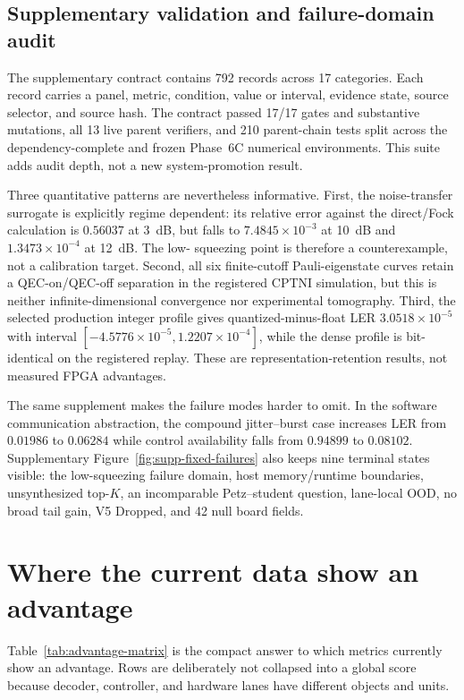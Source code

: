 \documentclass[11pt]{article}
\begin{document}
\subsection{Supplementary validation and failure-domain audit}

The supplementary contract contains 792 records across 17 categories.  Each
record carries a panel, metric, condition, value or interval, evidence state,
source selector, and source hash.  The contract passed 17/17 gates and
substantive mutations, all 13 live parent verifiers, and 210 parent-chain tests
split across the dependency-complete and frozen Phase~6C numerical
environments.  This suite adds audit depth, not a new system-promotion result.

Three quantitative patterns are nevertheless informative.  First, the
noise-transfer surrogate is explicitly regime dependent: its relative error
against the direct/Fock calculation is $0.56037$ at 3~dB, but falls to
$7.4845\times10^{-3}$ at 10~dB and $1.3473\times10^{-4}$ at 12~dB.  The low-
squeezing point is therefore a counterexample, not a calibration target.
Second, all six finite-cutoff Pauli-eigenstate curves retain a QEC-on/QEC-off
separation in the registered CPTNI simulation, but this is neither
infinite-dimensional convergence nor experimental tomography.  Third, the
selected production integer profile gives quantized-minus-float LER
$3.0518\times10^{-5}$ with interval
$[-4.5776\times10^{-5},1.2207\times10^{-4}]$, while the dense profile is
bit-identical on the registered replay.  These are representation-retention
results, not measured FPGA advantages.

The same supplement makes the failure modes harder to omit.  In the software
communication abstraction, the compound jitter--burst case increases LER from
$0.01986$ to $0.06284$ while control availability falls from $0.94899$ to
$0.08102$.  Supplementary Figure~\ref{fig:supp-fixed-failures} also keeps nine
terminal states visible: the low-squeezing failure domain, host memory/runtime
boundaries, unsynthesized top-$K$, an incomparable Petz--student question,
lane-local OOD, no broad tail gain, V5 Dropped, and 42 null board fields.

\section{Where the current data show an advantage}

Table~\ref{tab:advantage-matrix} is the compact answer to which metrics
currently show an advantage.  Rows are deliberately not collapsed into a
global score because decoder, controller, and hardware lanes have different
objects and units.
\end{document}

